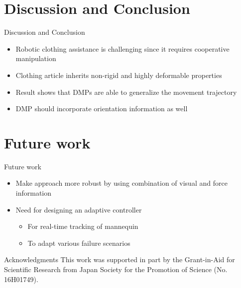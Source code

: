 \documentclass[aspectratio=43,11pt,xcolor={dvipsnames}]{beamer}
\begin{document}
\section{Discussion and Conclusion}
\begin{frame}{Discussion and Conclusion}
	\linespread{1.5}

	\begin{itemize}
		\item Robotic clothing assistance is challenging since it requires cooperative manipulation
		\item Clothing article inherits non-rigid and highly deformable properties
		\item Result shows that DMPs are able to generalize the movement trajectory
		\item DMP should incorporate orientation information as well
	\end{itemize}
\end{frame}

\section{Future work}
\begin{frame}{Future work}
	\linespread{1.5}

	\begin{itemize}
		\item Make approach more robust by using combination of visual and force information
		\item Need for designing an adaptive controller
		      \begin{itemize}
		      	\item For real-time tracking of mannequin
		      	\item To adapt various failure scenarios
		      \end{itemize}
	\end{itemize}

	\begin{exampleblock}{Acknowledgments}
		This work was supported in part by the Grant-in-Aid for Scientific Research from Japan Society for the Promotion of Science (No. 16H01749).
	\end{exampleblock}
\end{frame}
\end{document}
